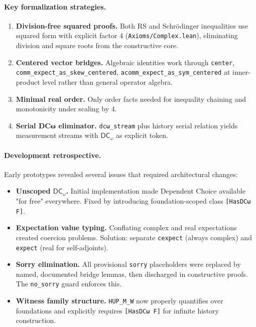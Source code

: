 \documentclass[11pt]{article}
\newcommand{\DCw}{\mathsf{DC}_{\omega}}
\newcommand{\lean}[1]{\texttt{#1}}
\theoremstyle{plain}
\theoremstyle{definition}
\theoremstyle{remark}
\begin{document}
\paragraph{Key formalization strategies.}
\begin{enumerate}
  \item \textbf{Division-free squared proofs.} Both RS and Schrödinger inequalities use squared form with explicit factor $4$ (\texttt{Axioms/Complex.lean}), eliminating division and square roots from the constructive core.
  \item \textbf{Centered vector bridges.} Algebraic identities work through \lean{center}, \lean{comm\_expect\_as\_skew\_centered}, \lean{acomm\_expect\_as\_sym\_centered} at inner-product level rather than general operator algebra.
  \item \textbf{Minimal real order.} Only order facts needed for inequality chaining and monotonicity under scaling by $4$.
  \item \textbf{Serial DCω eliminator.} \lean{dcω\_stream} plus history serial relation yields measurement streams with $\DCw$ as explicit token.
\end{enumerate}

\paragraph{Development retrospective.}
Early prototypes revealed several issues that required architectural changes:
\begin{itemize}
  \item \textbf{Unscoped $\DCw$.} Initial implementation made Dependent Choice available "for free" everywhere. Fixed by introducing foundation-scoped class \lean{[HasDCω F]}.
  \item \textbf{Expectation value typing.} Conflating complex and real expectations created coercion problems. Solution: separate \lean{cexpect} (always complex) and \lean{expect} (real for self-adjoints).
  \item \textbf{Sorry elimination.} All provisional \texttt{sorry} placeholders were replaced by named, documented bridge lemmas, then discharged in constructive proofs. The \texttt{no\_sorry} guard enforces this.
  \item \textbf{Witness family structure.} \lean{HUP\_M\_W} now properly quantifies over foundations and explicitly requires \lean{[HasDCω F]} for infinite history construction.
\end{itemize}
\end{document}
